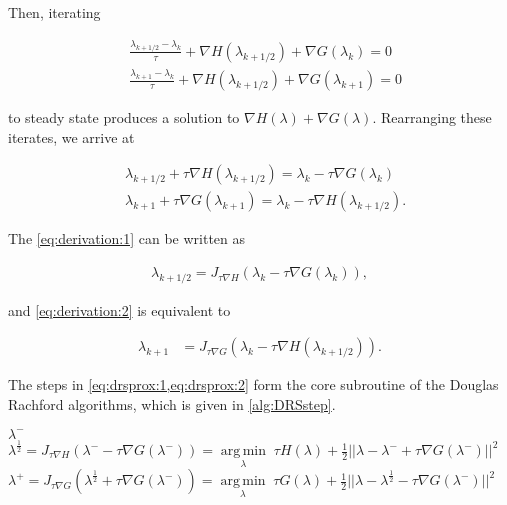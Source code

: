 \documentclass[11pt]{article}
\newcommand{\half}{^{\frac 12}}
\newcommand{\plus}{^+}
\newcommand{\minus}{^-}
\newcommand{\argmin}[1]{\underset{#1}{\operatorname{arg\,min}}\;}
\def\grad {{\nabla}}
\begin{document}
\noindent Then, iterating

\begin{align}
&\frac {\lambda_{k+1/2} - \lambda_k}\tau + \grad H(\lambda_{k+1/2}) + \grad G(\lambda_k) = 0 \\
&\frac {\lambda_{k+1} - \lambda_k}\tau + \grad H(\lambda_{k+1/2}) + \grad G(\lambda_{k+1}) = 0
\end{align}

\noindent to steady state produces a solution to $\grad H(\lambda) +
\grad G(\lambda)$.  Rearranging these iterates, we arrive at

\begin{align}
&\lambda_{k+1/2} + \tau\grad H(\lambda_{k+1/2}) = \lambda_k - \tau\grad G(\lambda_k) \label{eq:derivation:1}\\
&\lambda_{k+1} + \tau\grad G(\lambda_{k+1}) = \lambda_k - \tau\grad H(\lambda_{k+1/2}). \label{eq:derivation:2}
\end{align}

\noindent The \cref{eq:derivation:1} can be written as

\begin{align}
\lambda_{k+1/2} = J_{\tau\grad H}(\lambda_k - \tau\grad G(\lambda_k)), \label{eq:drsprox:1}
\end{align}

\noindent and \cref{eq:derivation:2} is equivalent to

\begin{align}
\lambda_{k+1} &= J_{\tau\grad G}(\lambda_k - \tau\grad H(\lambda_{k+1/2})). \label{eq:drsprox:2}
\end{align}

\noindent The steps in \cref{eq:drsprox:1,eq:drsprox:2} form the core
subroutine of the Douglas Rachford algorithms, which is given in
\cref{alg:DRSstep}.

\begin{algorithm}[!]
\caption{$\texttt{DRSstep}(\lambda\minus)$}
\label{alg:DRSstep}
\begin{algorithmic}[1]
\REQUIRE $\lambda\minus$
\STATE $\lambda\half = J_{\tau \grad H}(\lambda\minus - \tau \grad G(\lambda\minus)) = \argmin{\lambda} \tau H(\lambda) + \frac 12||\lambda - \lambda\minus + \tau \grad G(\lambda\minus)||^2$
\STATE $\lambda\plus = J_{\tau \grad G}(\lambda\half + \tau \grad G(\lambda\minus)) = \argmin{\lambda} \tau G(\lambda) + \frac 12||\lambda - \lambda\half - \tau \grad G(\lambda\minus)||^2$
\RETURN {$\lambda\plus$}
\end{algorithmic}
\end{algorithm}
\end{document}
